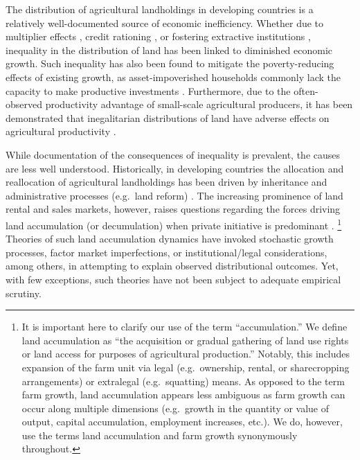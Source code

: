 \documentclass[english]{article}
\begin{document}
The distribution of agricultural landholdings in developing countries is a 
relatively well-documented source of economic inefficiency.
Whether due to multiplier effects \citep{mellor1976}, credit rationing 
\citep{deininger1998}, or fostering extractive institutions 
\citep{acemoglu2002}, inequality in the distribution of land has been linked 
to diminished economic growth.
Such inequality has also been found to mitigate the poverty-reducing effects 
of existing growth, as asset-impoverished households commonly lack the 
capacity to make productive investments 
\citep{deininger1998, ravallion2002, lipton2009}.
Furthermore, due to the often-observed productivity advantage of small-scale 
agricultural producers, it has been demonstrated that inegalitarian distributions 
of land have adverse effects on agricultural productivity  
\citep{eswaran1986, vollrath2007, lipton2009}.

While documentation of the consequences of inequality is prevalent, the causes 
are less well understood.
Historically, in developing countries the allocation and reallocation of 
agricultural landholdings has been driven by inheritance and administrative 
processes (e.g.\ land reform) 
\citep{binswanger1995, deininger2001, lipton2009}.
The increasing prominence of land rental and sales markets, however, raises 
questions regarding the forces driving land accumulation (or decumulation) 
when private initiative is predominant
\citep{boucher2005, deininger2008b, holden2009}.%
\footnote{It is important here to clarify our use of the term ``accumulation.''
We define land accumulation as ``the acquisition or gradual gathering of land 
use rights or land access for purposes of agricultural production.''  
Notably, this includes expansion of the farm unit via legal (e.g.\ ownership, 
rental, or sharecropping arrangements) or extralegal (e.g.\ squatting) means.
As opposed to the term farm growth, land accumulation appears less ambiguous 
as farm growth can occur along multiple dimensions (e.g.\ growth in the quantity 
or value of output, capital accumulation, employment increases, etc.).
We do, however, use the terms land accumulation and farm growth 
synonymously throughout.}
Theories of such land accumulation dynamics have invoked stochastic growth 
processes, factor market imperfections, or institutional/legal considerations, 
among others, in attempting to explain observed distributional outcomes.
Yet, with few exceptions, such theories have not been subject to adequate
empirical scrutiny.
\end{document}
